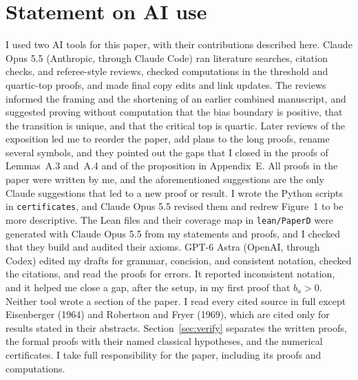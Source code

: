 \documentclass[EJP,preprint]{ejpecp}
\begin{document}
\section*{Statement on AI use}
I used two AI tools for this paper, with their contributions described here. Claude Opus 5.5
(Anthropic, through Claude Code) ran literature searches, citation checks,
and referee-style reviews, checked computations in the threshold and
quartic-top proofs, and made final copy edits and link updates. The
reviews informed the framing and the shortening of an earlier combined
manuscript, and suggested proving without computation that the bias
boundary is positive, that the transition is unique, and that the critical
top is quartic. Later reviews of the exposition led me to reorder the
paper, add plans to the long proofs, rename several symbols, and they pointed out the gaps that I closed in the proofs of
Lemmas~A.3 and~A.4 and of the proposition in Appendix~E. All proofs in
the paper were written by me, and the aforementioned suggestions are the
only Claude suggestions that led to a new proof or result. I wrote the
Python scripts in \nolinkurl{certificates}, and Claude Opus 5.5 revised
them and redrew Figure~1 to be more descriptive. The Lean files and their coverage map in
\nolinkurl{lean/PaperD} were generated with Claude Opus 5.5 from my
statements and proofs, and I checked that they build and audited their
axioms. GPT-6 Astra (OpenAI, through Codex) edited my
drafts for grammar, concision, and consistent notation, checked the
citations, and read the proofs for errors. It reported inconsistent
notation, and it helped me close a gap, after the setup, in my first proof
that $b_a>0$. Neither tool wrote a section of the paper. I read every cited
source in full except Eisenberger (1964) and Robertson and Fryer (1969),
which are cited only for results stated in their abstracts.
Section~\ref{sec:verify} separates the written proofs, the formal proofs
with their named classical hypotheses, and the numerical certificates.
I take full responsibility for the paper, including its proofs and
computations.


\end{document}
